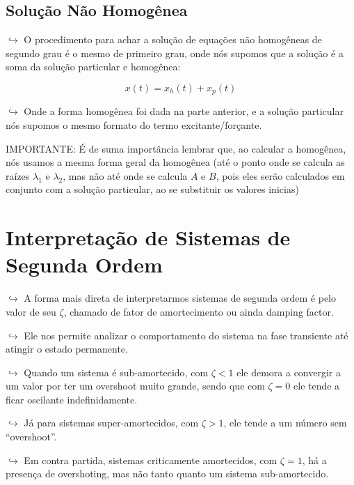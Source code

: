 \documentclass[]{article}
\begin{document}
  \hypertarget{soluuxe7uxe3o-nuxe3o-homoguxeanea-1}{%
  \subsection{Solução Não
  Homogênea}\label{soluuxe7uxe3o-nuxe3o-homoguxeanea-1}}

  \(\hookrightarrow\) O procedimento para achar a solução de equações não
  homogêneas de segundo grau é o mesmo de primeiro grau, onde nós supomos
  que a solução é a soma da solução particular e homogênea:

  \[
  x(t) = x_h(t) + x_p(t)
  \]

  \(\hookrightarrow\) Onde a forma homogênea foi dada na parte anterior, e
  a solução particular nós supomos o mesmo formato do termo
  excitante/forçante.

  IMPORTANTE: É de suma importância lembrar que, ao calcular a homogênea,
  nós usamos a mesma forma geral da homogênea (até o ponto onde se calcula
  as raízes \(\lambda_1\) e \(\lambda_2\), mas não até onde se calcula
  \(A\) e \(B\), pois eles serão calculados em conjunto com a solução
  particular, ao se substituir os valores inicias)

  \hypertarget{interpretauxe7uxe3o-de-sistemas-de-segunda-ordem}{%
  \section{Interpretação de Sistemas de Segunda
  Ordem}\label{interpretauxe7uxe3o-de-sistemas-de-segunda-ordem}}

  \(\hookrightarrow\) A forma mais direta de interpretarmos sistemas de
  segunda ordem é pelo valor de seu \(\zeta\), chamado de fator de
  amortecimento ou ainda damping factor.

  \(\hookrightarrow\) Ele nos permite analizar o comportamento do sistema
  na fase transiente até atingir o estado permanente.

  \(\hookrightarrow\) Quando um sistema é sub-amortecido, com
  \(\zeta < 1\) ele demora a convergir a um valor por ter um overshoot
  muito grande, sendo que com \(\zeta = 0\) ele tende a ficar oscilante
  indefinidamente.

  \(\hookrightarrow\) Já para sistemas super-amortecidos, com
  \(\zeta > 1\), ele tende a um número sem ``overshoot''.

  \(\hookrightarrow\) Em contra partida, sistemas criticamente
  amortecidos, com \(\zeta = 1\), há a presença de overshoting, mas não
  tanto quanto um sistema sub-amortecido.
\end{document}

